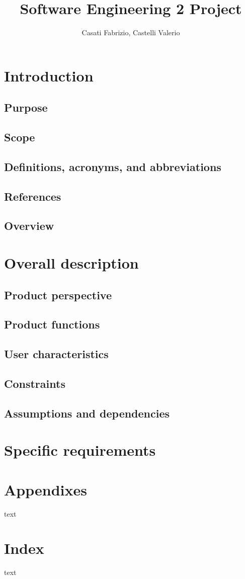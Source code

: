 \documentclass{scrbook}
\begin{document}
\title{Software Engineering 2 Project}
\author{Casati Fabrizio, Castelli Valerio}

\maketitle
\tableofcontents

\chapter{Introduction}
\section{Purpose}
\section{Scope}
\section{Definitions, acronyms, and abbreviations}
\section{References}
\section{Overview}

\chapter{Overall description}
\section{Product perspective}
\section{Product functions}
\section{User characteristics}
\section{Constraints}
\section{Assumptions and dependencies}

\chapter{Specific requirements}

\chapter*{Appendixes}
text

\chapter*{Index}
text
\end{document}
